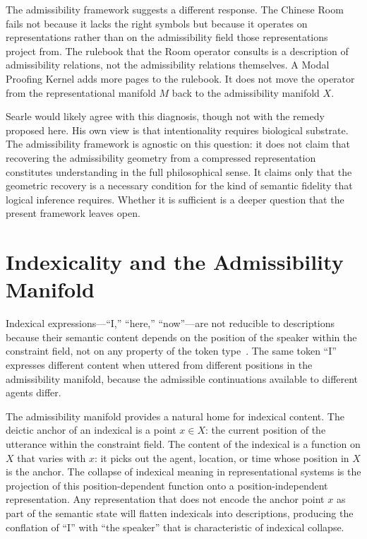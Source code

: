 \documentclass[12pt, oneside]{book}
\theoremstyle{plain-flyxion}
\theoremstyle{definition-flyxion}
\begin{document}
The admissibility framework suggests a different response. The Chinese Room fails not
because it lacks the right symbols but because it operates on representations rather than
on the admissibility field those representations project from. The rulebook that the Room
operator consults is a description of admissibility relations, not the admissibility
relations themselves. A Modal Proofing Kernel adds more pages to the rulebook. It does not
move the operator from the representational manifold $M$ back to the admissibility
manifold $X$.

Searle would likely agree with this diagnosis, though not with the remedy proposed here.
His own view is that intentionality requires biological substrate. The admissibility
framework is agnostic on this question: it does not claim that recovering the
admissibility geometry from a compressed representation constitutes understanding in the
full philosophical sense. It claims only that the geometric recovery is a necessary
condition for the kind of semantic fidelity that logical inference requires. Whether it is
sufficient is a deeper question that the present framework leaves open.

\section{Indexicality and the Admissibility Manifold}

Indexical expressions---``I,'' ``here,'' ``now''---are not reducible to descriptions
because their semantic content depends on the position of the speaker within the
constraint field, not on any property of the token
type~\cite{perry1993,kaplan1989}. The same token ``I'' expresses different content when
uttered from different positions in the admissibility manifold, because the admissible
continuations available to different agents differ.

The admissibility manifold provides a natural home for indexical content. The deictic
anchor of an indexical is a point $x\in X$: the current position of the utterance within
the constraint field. The content of the indexical is a function on $X$ that varies with
$x$: it picks out the agent, location, or time whose position in $X$ is the anchor. The
collapse of indexical meaning in representational systems is the projection of this
position-dependent function onto a position-independent representation. Any representation
that does not encode the anchor point $x$ as part of the semantic state will flatten
indexicals into descriptions, producing the conflation of ``I'' with ``the speaker'' that
is characteristic of indexical collapse.
\end{document}
